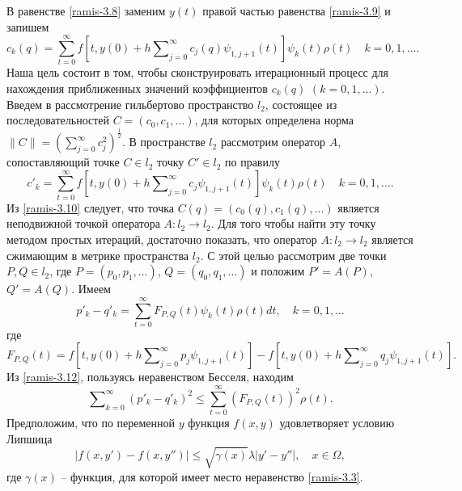 В равенстве  \eqref{ramis-3.8} заменим $y(t)$ правой частью равенства \eqref{ramis-3.9} и запишем
\begin{equation}\label{ramis-3.10}
c_k(q)=\sum_{t=0}^{\infty} f\left[t,y(0)+h\sum\nolimits_{j=0}^\infty c_j(q)\psi_{1,j+1}(t)\right]\psi_{k}(t)\rho(t)\quad k=0,1,\ldots.
\end{equation}
Наша цель состоит в том, чтобы сконструировать итерационный процесс для нахождения приближенных значений коэффициентов $c_k(q)$ $(k=0,1,\ldots)$.
Введем в рассмотрение гильбертово пространство $l_2$, состоящее из последовательностей $C=(c_0,c_1,\ldots)$, для которых определена норма
$\|C\|=\left(\sum_{j=0}^\infty c_j^2\right)^\frac12$.  В пространстве $l_2$ рассмотрим оператор $A$, сопоставляющий точке $C\in l_2$ точку $C'\in l_2$ по правилу
\begin{equation}\label{ramis-3.11}
c'_k=\sum_{t=0}^{\infty} f\left[t,y(0)+h\sum\nolimits_{j=0}^\infty c_j\psi_{1,j+1}(t)\right]\psi_{k}(t)\rho(t)\quad k=0,1,\ldots.
\end{equation}
Из \eqref{ramis-3.10} следует, что точка $C(q)=(c_0(q),c_1(q),\ldots)$ является неподвижной точкой оператора $A:l_2\to l_2$. Для того чтобы найти эту точку  методом простых итераций, достаточно показать, что оператор $A:l_2\to l_2$ является сжимающим в метрике пространства $l_2$. С этой целью рассмотрим две точки $P,Q\in l_2$, где $P=(p_0, p_1, \ldots)$, $Q=(q_0, q_1, \ldots)$ и положим $P'=A(P)$, $Q'=A(Q)$. Имеем
\begin{equation}\label{ramis-3.12}
p'_k-q'_k=\sum_{t=0}^{\infty}F_{P,Q}(t)\psi_k(t)\rho(t)dt,\quad k=0,1,\ldots
\end{equation}
где
\begin{equation}\label{ramis-3.13}
 F_{P,Q}(t)=f\left[t,y(0)+h\sum\nolimits_{j=0}^\infty p_j\psi_{1,j+1}(t)\right]
  -f\left[t,y(0)+h\sum\nolimits_{j=0}^\infty q_j\psi_{1,j+1}(t)\right].
\end{equation}
Из \eqref{ramis-3.12}, пользуясь неравенством Бесселя, находим
 \begin{equation}\label{ramis-3.14}
\sum\nolimits_{k=0}^\infty (p'_k-q'_k)^2\le\sum_{t=0}^{\infty}(F_{P,Q}(t))^2\rho(t).
\end{equation}
 Предположим, что по переменной $y$ функция $f(x,y)$ удовлетворяет условию Липшица
 \begin{equation}\label{ramis-3.15}
|f(x,y')-f(x,y'')|\le \sqrt{\gamma(x)}\lambda|y'-y''|, \quad  x\in\Omega,
\end{equation}
где $\gamma(x)$ -- функция, для которой имеет место неравенство \eqref{ramis-3.3}.
